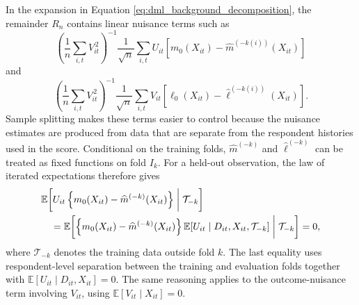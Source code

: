 \documentclass[11pt,oneside,a4paper]{book}
\begin{document}
In the expansion in Equation \ref{eq:dml_background_decomposition}, the remainder \(R_n\) contains linear nuisance terms such as
\begin{equation}
\left(
\frac{1}{n}\sum_{i,t}V_{it}^{\,2}
\right)^{-1}
\frac{1}{\sqrt{n}}\sum_{i,t}
U_{it}
\left[
m_0(X_{it})
-\widehat{m}^{(-k(i))}(X_{it})
\right]
\label{eq:crossfit_m_remainder}
\end{equation}
and
\begin{equation}
\left(
\frac{1}{n}\sum_{i,t}V_{it}^{\,2}
\right)^{-1}
\frac{1}{\sqrt{n}}\sum_{i,t}
V_{it}
\left[
\ell_0(X_{it})
-\widehat{\ell}^{(-k(i))}(X_{it})
\right].
\label{eq:crossfit_l_remainder}
\end{equation}
Sample splitting makes these terms easier to control because the nuisance estimates are produced from data that are separate from the respondent histories used in the score. Conditional on the training folds, \(\widehat{m}^{(-k)}\) and \(\widehat{\ell}^{(-k)}\) can be treated as fixed functions on fold \(I_k\). For a held-out observation, the law of iterated expectations therefore gives
\begin{equation}
\begin{aligned}
&\mathbb{E}\!\left[
U_{it}
\left\{
m_0(X_{it})-\widehat{m}^{(-k)}(X_{it})
\right\}
\biggm| \mathcal{T}_{-k}
\right] \\
&\quad=
\mathbb{E}\!\left[
\left\{
m_0(X_{it})-\widehat{m}^{(-k)}(X_{it})
\right\}
\mathbb{E}[U_{it}\mid D_{it},X_{it},\mathcal{T}_{-k}]
\biggm| \mathcal{T}_{-k}
\right]
=0,
\end{aligned}
\label{eq:crossfit_m_lie}
\end{equation}
where \(\mathcal{T}_{-k}\) denotes the training data outside fold \(k\). The last equality uses respondent-level separation between the training and evaluation folds together with \(\mathbb{E}[U_{it}\mid D_{it},X_{it}]=0\). The same reasoning applies to the outcome-nuisance term involving \(V_{it}\), using \(\mathbb{E}[V_{it}\mid X_{it}]=0\).
\end{document}
